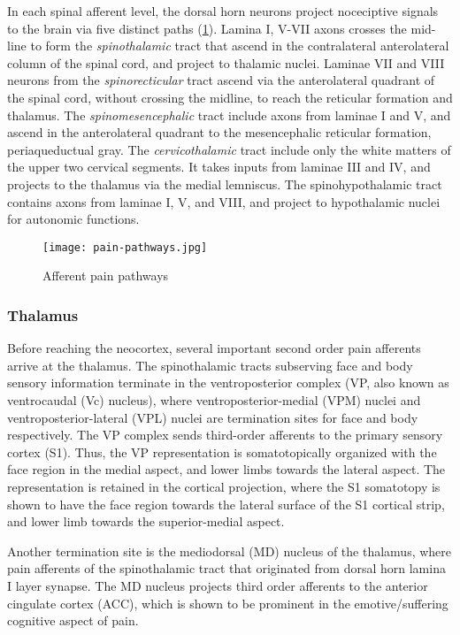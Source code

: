 In each spinal afferent level, the dorsal horn neurons project noceciptive signals to the brain via five distinct paths (\ref{fig:pain-pathways}). Lamina I, V-VII axons crosses the mid-line to form the \textit{spinothalamic} tract that ascend in the contralateral anterolateral column of the spinal cord, and project to thalamic nuclei. Laminae VII and VIII neurons from the \textit{spinorecticular} tract ascend via the anterolateral quadrant of the spinal cord, without crossing the midline, to reach the reticular formation and thalamus. The \textit{spinomesencephalic} tract include axons from laminae I and V, and ascend in the anterolateral quadrant to the mesencephalic reticular formation, periaqueductual gray. The \textit{cervicothalamic} tract include only the white matters of the upper two cervical segments. It takes inputs from laminae III and IV, and projects to the thalamus via the medial lemniscus. The spinohypothalamic tract contains axons from laminae I, V, and VIII, and project to hypothalamic nuclei for autonomic functions. 

 \begin{figure}[ht]
 \texttt{[image: pain-pathways.jpg]}
 \centering
 \caption{Afferent pain pathways} 
 \label{fig:pain-pathways}
 \end{figure}
 
 
\subsubsection{Thalamus}

Before reaching the neocortex, several important second order pain afferents arrive at the thalamus. The spinothalamic tracts subserving face and body sensory information terminate in the ventroposterior complex (VP, also known as ventrocaudal (Vc) nucleus), where ventroposterior-medial (VPM) nuclei and ventroposterior-lateral (VPL) nuclei are termination sites for face and body respectively. The VP complex sends third-order afferents to the primary sensory cortex (S1). Thus, the VP representation is somatotopically organized with the face region in the medial aspect, and lower limbs towards the lateral aspect. The representation is retained in the cortical projection, where the S1 somatotopy is shown to have the face region towards the lateral surface of the S1 cortical strip, and lower limb towards the superior-medial aspect. 

Another termination site is the mediodorsal (MD) nucleus of the thalamus, where pain afferents of the spinothalamic tract that originated from dorsal horn lamina I layer synapse. The MD nucleus projects third order afferents to the anterior cingulate cortex (ACC), which is shown to be prominent in the emotive/suffering cognitive aspect of pain.  

